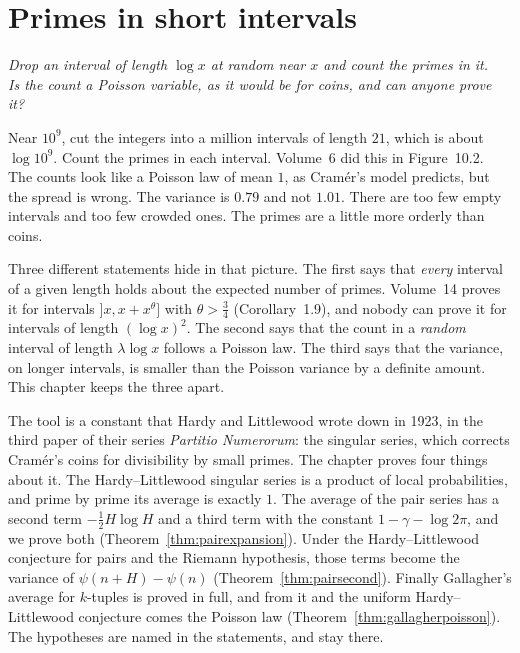 \chapter{Primes in short intervals}\label{ch:oc-short}

\begin{center}\itshape
Drop an interval of length $\log x$ at random near $x$ and count the primes in it.\\
Is the count a Poisson variable, as it would be for coins, and can anyone prove it?
\end{center}

Near $10^9$, cut the integers into a million intervals of length $21$, which is about $\log 10^9$. Count the primes in each interval. Volume~6 did this in Figure~10.2. The counts look like a Poisson law of mean $1$, as Cram\'er's model predicts, but the spread is wrong. The variance is $0.79$ and not $1.01$. There are too few empty intervals and too few crowded ones. The primes are a little more orderly than coins.

Three different statements hide in that picture. The first says that \emph{every} interval of a given length holds about the expected number of primes. Volume~14 proves it for intervals $]x,x+x^\theta]$ with $\theta>\frac34$ (Corollary~1.9), and nobody can prove it for intervals of length $(\log x)^2$. The second says that the count in a \emph{random} interval of length $\lambda\log x$ follows a Poisson law. The third says that the variance, on longer intervals, is smaller than the Poisson variance by a definite amount. This chapter keeps the three apart.

The tool is a constant that Hardy and Littlewood wrote down in 1923, in the third paper of their series \emph{Partitio Numerorum}: the singular series, which corrects Cram\'er's coins for divisibility by small primes. The chapter proves four things about it. The Hardy--Littlewood singular series is a product of local probabilities, and prime by prime its average is exactly $1$. The average of the pair series has a second term $-\frac12H\log H$ and a third term with the constant $1-\gamma-\log2\pi$, and we prove both (Theorem~\ref{thm:pairexpansion}). Under the Hardy--Littlewood conjecture for pairs and the Riemann hypothesis, those terms become the variance of $\psi(n+H)-\psi(n)$ (Theorem~\ref{thm:pairsecond}). Finally Gallagher's average for $k$-tuples is proved in full, and from it and the uniform Hardy--Littlewood conjecture comes the Poisson law (Theorem~\ref{thm:gallagherpoisson}). The hypotheses are named in the statements, and stay there.

